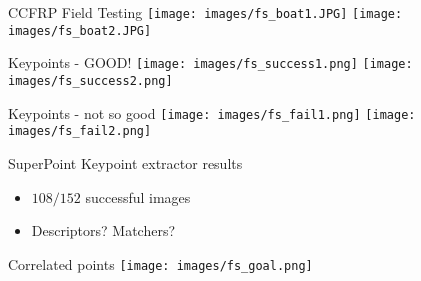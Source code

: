 
\begin{frame}{CCFRP Field Testing}
    \centering
    \texttt{[image: images/fs\_boat1.JPG]}
    \texttt{[image: images/fs\_boat2.JPG]}
\end{frame}

\begin{frame}{Keypoints - GOOD!}
    \centering
    \texttt{[image: images/fs\_success1.png]}
    \texttt{[image: images/fs\_success2.png]}
\end{frame}

\begin{frame}{Keypoints - not so good}
    \centering
    \texttt{[image: images/fs\_fail1.png]}
    \texttt{[image: images/fs\_fail2.png]}
\end{frame}

\begin{frame}{SuperPoint Keypoint extractor results}
    \begin{itemize}
        \item $108/152$ successful images
        \item Descriptors? Matchers?
    \end{itemize} 
\end{frame}

\begin{frame}{Correlated points}
    \centering
    \texttt{[image: images/fs\_goal.png]}
\end{frame}



